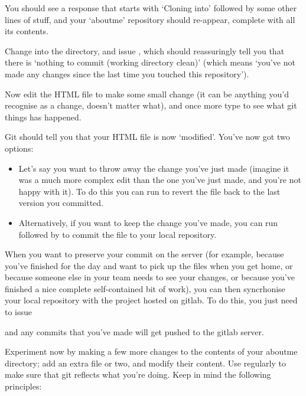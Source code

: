 You should see a response that starts with `Cloning into' followed by some other lines of stuff, and your `aboutme' repository should re-appear, complete with all its contents.

Change into the  directory, and issue , which should reassuringly tell you that there is `nothing to commit (working directory clean)' (which means `you've not made any changes since the last time you touched this repository'). 

Now edit the HTML file to make some small change (it can be anything you'd recognise as a change, doesn't matter what), and once more type  to see what git things has happened.

Git should tell you that your HTML file is now `modified'. You've now got two options:
\begin{itemize}
\item Let's say you want to throw away the change you've just made  (imagine it was a much more complex edit
  than the one you've just  made, and you're not happy with it). To do this you can run
   to revert the file back to the
  last version you committed.
\item Alternatively, if you want to keep the change you've made, you can run 
  followed by  to commit the file to your local repository. 
\end{itemize}

When you want to preserve your commit on the server (for example, because you've finished for the day and want to pick up the files when you get home, or because someone else in your team needs to see your changes, or because you've finished a nice complete self-contained bit of work), you can then syncrhonise your local repository with the project hosted on gitlab. To do this, you just need to issue 


and any commits that you've made will get pushed to the gitlab server. 

Experiment now by making a few more changes to the contents of your aboutme directory; add an extra file or two, and modify their content. Use  regularly to make sure that git reflects what you're doing. Keep in mind the following principles:

